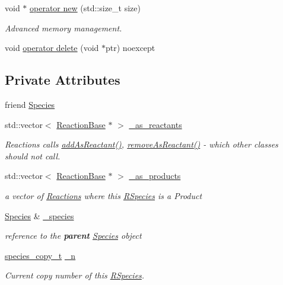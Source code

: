 \begin{DoxyCompactItemize}
void $\ast$ \hyperlink{classchem_1_1RSpecies_a8f8eeb52d60143c6fb7b7f87eee4f55c}{operator new} (std\-::size\-\_\-t size)
\begin{DoxyCompactList}\small\item\em Advanced memory management. \end{DoxyCompactList}\item 
void \hyperlink{classchem_1_1RSpecies_a59eeac181b75f878e4804fb2ce57dbb2}{operator delete} (void $\ast$ptr) noexcept
\end{DoxyCompactItemize}
\subsection*{Private Attributes}
\begin{DoxyCompactItemize}
\item 
friend \hyperlink{classchem_1_1RSpecies_af22c5fa6d6a8be2cd26b77fc4cbb820f}{Species}
\item 
std\-::vector$<$ \hyperlink{classchem_1_1ReactionBase}{Reaction\-Base} $\ast$ $>$ \hyperlink{classchem_1_1RSpecies_a7ffda464bbe610c372cac83e6e735023}{\-\_\-as\-\_\-reactants}
\begin{DoxyCompactList}\small\item\em Reactions calls \hyperlink{classchem_1_1RSpecies_a2f69141d801e4660ab411953fef74ea2}{add\-As\-Reactant()}, \hyperlink{classchem_1_1RSpecies_ab8f32e15791cfddea7cf4cac5a39c0fa}{remove\-As\-Reactant()} -\/ which other classes should not call. \end{DoxyCompactList}\item 
std\-::vector$<$ \hyperlink{classchem_1_1ReactionBase}{Reaction\-Base} $\ast$ $>$ \hyperlink{classchem_1_1RSpecies_ad4d3712865ed15fd9b581810ffe1b0e7}{\-\_\-as\-\_\-products}
\begin{DoxyCompactList}\small\item\em a vector of \hyperlink{classchem_1_1Reaction}{Reactions} where this \hyperlink{classchem_1_1RSpecies}{R\-Species} is a Product \end{DoxyCompactList}\item 
\hyperlink{classchem_1_1Species}{Species} \& \hyperlink{classchem_1_1RSpecies_a3a979b9226800417c7aad81a2162fac5}{\-\_\-species}
\begin{DoxyCompactList}\small\item\em reference to the {\bfseries parent} \hyperlink{classchem_1_1Species}{Species} object \end{DoxyCompactList}\item 
\hyperlink{common_8h_a3503f321fd36304ee274141275cca586}{species\-\_\-copy\-\_\-t} \hyperlink{classchem_1_1RSpecies_a60e53ebfe464923452c54322dfd479dc}{\-\_\-n}
\begin{DoxyCompactList}\small\item\em Current copy number of this \hyperlink{classchem_1_1RSpecies}{R\-Species}. \end{DoxyCompactList}\end{DoxyCompactItemize}


